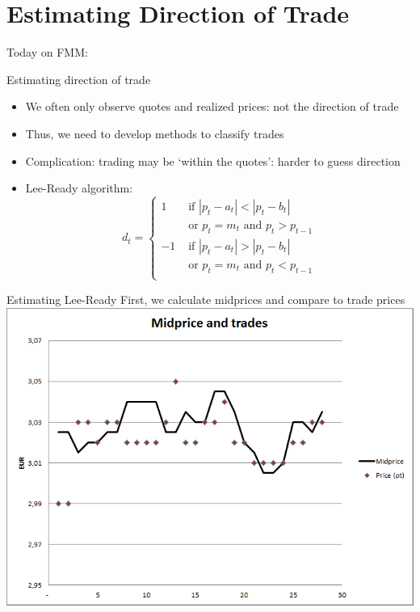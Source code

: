 \documentclass[english,10pt]{beamer}
\begin{document}
\section{Estimating Direction of Trade}

\begin{frame}{Today on FMM:}
\tableofcontents[currentsection]
\end{frame}


\begin{frame}{Estimating direction of trade}
	\begin{itemize}
		\item We often only observe quotes and realized prices: not the direction of trade
		\item Thus, we need to develop methods to classify trades
		\item Complication: trading may be `within the quotes': harder to guess direction
		\item \alert{Lee-Ready algorithm}:
		\[
		d_t = \left\{
		\begin{aligned}
		1 & \text{ if } |p_t-a_t| < |p_t-b_t| \\
		&\text{ or } p_t=m_t \text{ and } p_t>p_{t-1}\\
		-1 & \text{ if } |p_t-a_t| > |p_t-b_t| \\
		& \text{ or } p_t=m_t \text{ and } p_t<p_{t-1} \\
		\end{aligned}
		\right.
		\]
	\end{itemize}
\end{frame}


\begin{frame}{Estimating Lee-Ready}
	First, we calculate midprices and compare to trade prices
	\center
	\includegraphics[scale=0.39]{pics/L2_midandtrade}
\end{frame}
\end{document}
